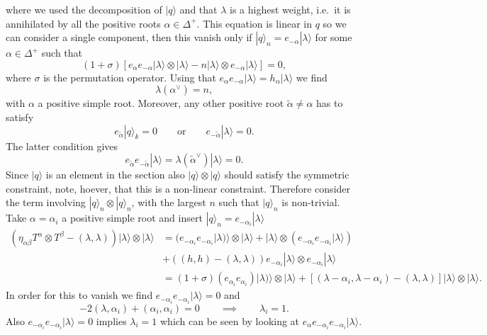 where we used the decomposition of $|q\rangle$ and that $\lambda$ is a highest weight, i.e.\ it is annihilated by all the positive roots $\alpha\in\Delta^+$. This equation is linear in $q$ so we can consider a single component, then this vanish only if $|q\rangle_n= e_{-\alpha}|\lambda\rangle$ for some $\alpha\in\Delta^+$ such that 
\begin{equation}
    \left(1+\sigma\right)\left[e_{\alpha}e_{-\alpha}|\lambda\rangle\otimes|\lambda\rangle-n|\lambda\rangle\otimes e_{-\alpha}|\lambda\rangle\right] = 0,
\end{equation}
where $\sigma$ is the permutation operator. Using that $e_{\alpha}e_{-\alpha}|\lambda\rangle = h_\alpha |\lambda\rangle$ we find  
\begin{equation}
    \lambda(\alpha^\vee) = n,
\end{equation}
with $\alpha$ a positive simple root. Moreover, any other positive root $\tilde{\alpha}\neq\alpha$ has to satisfy 
\begin{equation}
    e_{\tilde{\alpha}}|q\rangle_k = 0\qquad \text{or}\qquad e_{-\tilde{\alpha}}|\lambda\rangle = 0. 
\end{equation}
The latter condition gives 
\begin{equation}
    e_{\tilde{\alpha}}e_{-\tilde{\alpha}}|\lambda\rangle = \lambda(\tilde{\alpha}^\vee)|\lambda\rangle=0.
\end{equation}
Since $|q\rangle$ is an element in the section also $|q\rangle\otimes|q\rangle$ should satisfy the symmetric constraint, note, hoever, that this is a non-linear constraint. Therefore consider the term involving $|q\rangle_n\otimes|q\rangle_n$, with the largest $n$ such that $|q\rangle_n$ is non-trivial. Take $\alpha=\alpha_i$ a positive simple root and insert $|q\rangle_n=e_{-\alpha_i}|\lambda\rangle$
\begin{equation}
    \begin{aligned}
    \left(\eta_{\alpha\beta}T^\alpha\otimes T^\beta-(\lambda,\lambda)\right)|\lambda\rangle\otimes|\lambda\rangle &= (e_{-\alpha_i}e_{-\alpha_i}|\lambda)\rangle\otimes|\lambda\rangle+|\lambda\rangle\otimes (e_{-\alpha_i}e_{-\alpha_i}|\lambda\rangle)\\
    &+\left((h,h)-(\lambda,\lambda)\right)e_{-\alpha_i}|\lambda\rangle\otimes e_{-\alpha_i}|\lambda\rangle\\
    &= (1+\sigma)(e_{\alpha_i}e_{\alpha_i})|\lambda)\rangle\otimes|\lambda\rangle+\left[(\lambda-\alpha_i,\lambda-\alpha_i)-(\lambda,\lambda)\right]|\lambda\rangle\otimes|\lambda\rangle.
    \end{aligned}
\end{equation}
In order for this to vanish we find $e_{-\alpha_i}e_{-\alpha_i}|\lambda\rangle =0$ and 
\begin{equation}
    -2(\lambda,\alpha_i)+(\alpha_i,\alpha_i)=0\qquad \implies\qquad \lambda_i = 1.
\end{equation}
Also $e_{-\alpha_i}e_{-\alpha_i}|\lambda\rangle =0$ implies $\lambda_i=1$ which can be seen by looking at $e_{\alpha}e_{-\alpha_i}e_{-\alpha_i}|\lambda\rangle$. 

